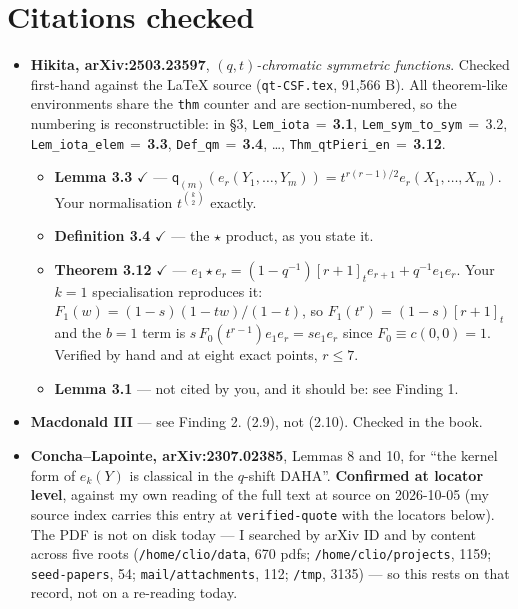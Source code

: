 \documentclass[11pt]{article}
\newcommand{\Fn}{F}
\begin{document}
\section{Citations checked}

\begin{itemize}
\item \textbf{Hikita, arXiv:2503.23597}, \emph{$(q,t)$-chromatic symmetric functions}.
Checked first-hand against the \LaTeX{} source (\texttt{qt-CSF.tex}, 91{,}566 B). All
theorem-like environments share the \texttt{thm} counter and are section-numbered, so the
numbering is reconstructible: in \S3, \texttt{Lem\_iota}$\,=\,$\textbf{3.1},
\texttt{Lem\_sym\_to\_sym}$\,=\,$3.2, \texttt{Lem\_iota\_elem}$\,=\,$\textbf{3.3},
\texttt{Def\_qm}$\,=\,$\textbf{3.4}, \dots, \texttt{Thm\_qtPieri\_en}$\,=\,$\textbf{3.12}.
\begin{itemize}
\item \textbf{Lemma 3.3} $\checkmark$ ---
$\mathsf{q}_{(m)}(e_r(Y_1,\dots,Y_m))=t^{r(r-1)/2}e_r(X_1,\dots,X_m)$. Your normalisation
$t^{\binom{k}{2}}$ exactly.
\item \textbf{Definition 3.4} $\checkmark$ --- the $\star$ product, as you state it.
\item \textbf{Theorem 3.12} $\checkmark$ ---
$e_1\star e_r=(1-q^{-1})[r+1]_te_{r+1}+q^{-1}e_1e_r$. Your $k=1$ specialisation reproduces it:
$\Fn_1(w)=(1-s)(1-tw)/(1-t)$, so $\Fn_1(t^r)=(1-s)[r+1]_t$ and the $b=1$ term is
$s\,\Fn_0(t^{r-1})e_1e_r=se_1e_r$ since $\Fn_0\equiv c(0,0)=1$. Verified by hand and at eight
exact points, $r\le7$.
\item \textbf{Lemma 3.1} --- not cited by you, and it should be: see Finding 1.
\end{itemize}
\item \textbf{Macdonald III} --- see Finding 2. (2.9), not (2.10). Checked in the book.
\item \textbf{Concha--Lapointe, arXiv:2307.02385}, Lemmas 8 and 10, for ``the kernel form of
$e_k(Y)$ is classical in the $q$-shift DAHA''. \textbf{Confirmed at locator level}, against my
own reading of the full text at source on 2026-10-05 (my source index carries this entry at
\texttt{verified-quote} with the locators below). The PDF is not on disk today --- I searched
by arXiv ID and by content across five roots (\texttt{/home/clio/data}, 670 pdfs;
\texttt{/home/clio/projects}, 1159; \texttt{seed-papers}, 54; \texttt{mail/attachments}, 112;
\texttt{/tmp}, 3135) --- so this rests on that record, not on a re-reading today.
\begin{itemize}

\end{itemize}
\end{itemize}
\end{document}
